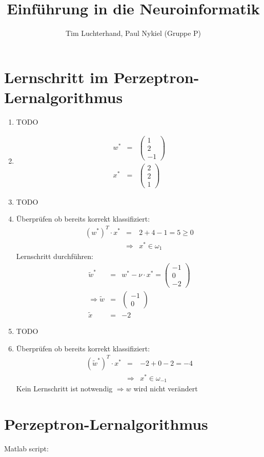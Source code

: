 \documentclass[DIN, pagenumber=false, fontsize=11pt, parskip=half]{scrartcl}
\title{Einführung in die Neuroinformatik}
\author{Tim Luchterhand, Paul Nykiel (Gruppe P)}
\begin{document}
    \maketitle
    \section{Lernschritt im Perzeptron-Lernalgorithmus}
    \begin{enumerate}[label=(\alph*)]
        \item TODO
        \item
            \begin{eqnarray*}
                w^* &=& \begin{pmatrix}
                    1 \\ 2\\ -1
                \end{pmatrix} \\
                x^* &=& \begin{pmatrix}
                    2 \\ 2\\ 1
                \end{pmatrix}
            \end{eqnarray*}
        \item TODO
        \item Überprüfen ob bereits korrekt klassifiziert:
            \begin{eqnarray*}
                {(w^*)}^T \cdot x^* &=& 2 + 4 - 1 = 5 \geq 0 \\
                &\Rightarrow& x^* \in \omega_{1}
            \end{eqnarray*}
            Lernschritt durchführen:
            \begin{eqnarray*}
                \tilde{w}^* &=& w^* - \nu \cdot x^* = \begin{pmatrix}
                    -1 \\ 0 \\ -2 
                \end{pmatrix} \\
                \Rightarrow \tilde{w} &=& 
                    \begin{pmatrix}
                        -1 \\ 0
                    \end{pmatrix} \\
                \tilde{x} &=& -2
            \end{eqnarray*}
        \item TODO
        \item Überprüfen ob bereits korrekt klassifiziert:
            \begin{eqnarray*}
                {(\tilde{w}^*)}^T \cdot x^*
                &=& -2 + 0 -2 = -4 \\
                &\Rightarrow& x^* \in \omega_{-1}
            \end{eqnarray*}
            Kein Lernschritt ist notwendig $\Rightarrow w$ wird nicht verändert
    \end{enumerate}
    \section{Perzeptron-Lernalgorithmus}
    Matlab script:
    
\end{document}
